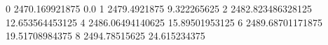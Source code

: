 0 2470.169921875 0.0
1 2479.4921875 9.322265625
2 2482.823486328125 12.653564453125
4 2486.06494140625 15.89501953125
6 2489.68701171875 19.51708984375
8 2494.78515625 24.615234375
